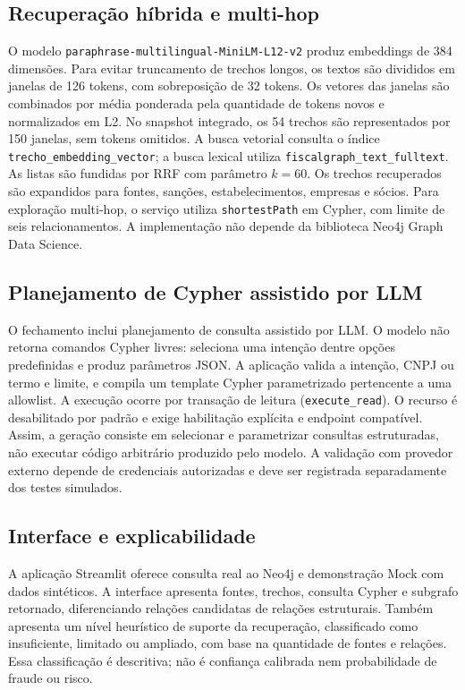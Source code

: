 \documentclass[conference]{IEEEtran}
\begin{document}
\subsection{Recuperação híbrida e multi-hop}
O modelo \texttt{paraphrase-multilingual-MiniLM-L12-v2} produz embeddings de 384 dimensões. Para evitar truncamento de trechos longos, os textos são divididos em janelas de 126 tokens, com sobreposição de 32 tokens. Os vetores das janelas são combinados por média ponderada pela quantidade de tokens novos e normalizados em L2. No snapshot integrado, os 54 trechos são representados por 150 janelas, sem tokens omitidos.
A busca vetorial consulta o índice \texttt{trecho\_embedding\_vector}; a busca lexical utiliza \texttt{fiscalgraph\_text\_fulltext}. As listas são fundidas por RRF com parâmetro $k=60$. Os trechos recuperados são expandidos para fontes, sanções, estabelecimentos, empresas e sócios. Para exploração multi-hop, o serviço utiliza \texttt{shortestPath} em Cypher, com limite de seis relacionamentos. A implementação não depende da biblioteca Neo4j Graph Data Science.
\subsection{Planejamento de Cypher assistido por LLM}
O fechamento inclui planejamento de consulta assistido por LLM. O modelo não retorna comandos Cypher livres: seleciona uma intenção dentre opções predefinidas e produz parâmetros JSON. A aplicação valida a intenção, CNPJ ou termo e limite, e compila um template Cypher parametrizado pertencente a uma allowlist. A execução ocorre por transação de leitura (\texttt{execute\_read}). O recurso é desabilitado por padrão e exige habilitação explícita e endpoint compatível. Assim, a geração consiste em selecionar e parametrizar consultas estruturadas, não executar código arbitrário produzido pelo modelo. A validação com provedor externo depende de credenciais autorizadas e deve ser registrada separadamente dos testes simulados.
\subsection{Interface e explicabilidade}
A aplicação Streamlit oferece consulta real ao Neo4j e demonstração Mock com dados sintéticos. A interface apresenta fontes, trechos, consulta Cypher e subgrafo retornado, diferenciando relações candidatas de relações estruturais. Também apresenta um nível heurístico de suporte da recuperação, classificado como insuficiente, limitado ou ampliado, com base na quantidade de fontes e relações. Essa classificação é descritiva; não é confiança calibrada nem probabilidade de fraude ou risco.
\end{document}

